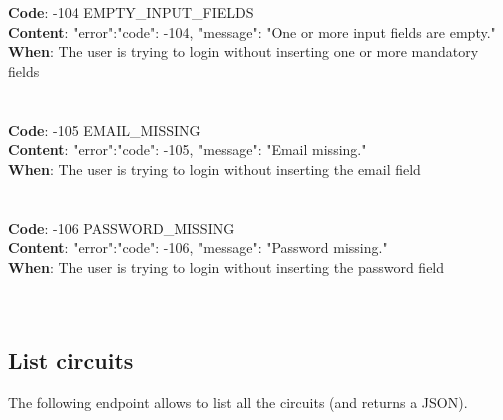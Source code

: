 \begin{itemize}
    \\
    \\
    \textbf{Code}: -104 EMPTY\_INPUT\_FIELDS\\
    \textbf{Content}: {"error":{"code": -104, "message": "One or more input fields are empty."}}\\
    \textbf{When}: The user is trying to login without inserting one or more mandatory fields\\
    \\
    \\
    \textbf{Code}: -105 EMAIL\_MISSING\\
    \textbf{Content}: {"error":{"code": -105, "message": "Email missing."}}\\
    \textbf{When}: The user is trying to login without inserting the email field\\
    \\
    \\
    \textbf{Code}: -106 PASSWORD\_MISSING\\
    \textbf{Content}: {"error":{"code": -106, "message": "Password missing."}}\\
    \textbf{When}: The user is trying to login without inserting the password field\\
    \\
    \\
\end{itemize}

\subsection*{List circuits}

The following endpoint allows to list all the circuits (and returns a JSON).

